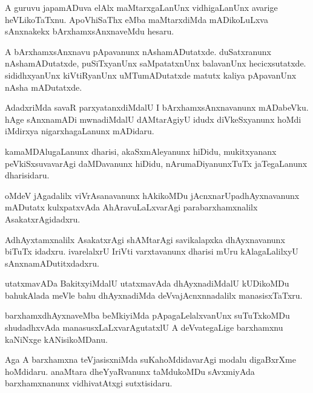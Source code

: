 \documentclass{article}
\begin{document}
\begin{mn}%
A guruvu japamADuva elAlx maMtarxgaLanUnx vidhigaLanUnx avarige
heVLikoTaTxnu. ApoVhiSaThx eMba maMtarxdiMda mADikoLuLxva sAnxnakekx
bArxhamxsAnxnaveMdu hesaru.
\end{mn}

\begin{mn}
A bArxhamxsAnxnavu pApavanunx nAshamADutatxde. duSatxranunx
nAshamADutatxde, puSiTxyanUnx saMpatatxnUnx balavanUnx
hecicxsutatxde. sididhxyanUnx kiVtiRyanUnx uMTumADutatxde matutx
kaliya pApavanUnx nAsha mADutatxde.
\end{mn}

\begin{mn}
AdadxriMda savaR parxyatanxdiMdalU I bArxhamxsAnxnavanunx
mADabeVku. hAge sAnxnamADi mwnadiMdalU dAMtarAgiyU idudx diVkeSxyanunx
hoMdi iMdirxya nigarxhagaLanunx mADidaru.
\end{mn}

\begin{mn}
kamaMDAlugaLanunx dharisi, akaSxmAleyanunx hiDidu, mukitxyananx
peVkiSxsuvavarAgi daMDavanunx hiDidu, nArumaDiyanunxTuTx jaTegaLanunx dharisidaru.
\end{mn}

\begin{mn}
oMdeV jAgadalilx viVrAsanavanunx hAkikoMDu jAcnxnarUpadhAyxnavanunx
mADutatx kulxpatxvAda AhAravuLaLxvarAgi parabarxhamxnalilx AsakatxrAgidadxru.
\end{mn}

\begin{mn}%
AdhAyxtamxnalilx AsakatxrAgi shAMtarAgi savikalapxka dhAyxnavanunx
biTuTx idadxru. ivarelalxrU IriVti varxtavanunx dharisi mUru
kAlagaLalilxyU sAnxnamADutitxdadxru.
\end{mn}

\begin{mn}
utatxmavADa BakitxyiMdalU utatxmavAda dhAyxnadiMdalU kUDikoMDu
bahukAlada meVle bahu dhAyxnadiMda deVvajAcnxnnadalilx manasisxTaTxru.
\end{mn}

\begin{mn}
barxhamxdhAyxnaveMba beMkiyiMda pApagaLelalxvanUnx suTuTxkoMDu
shudadhxvAda manasusxLaLxvarAgutatxlU A deVvategaLige barxhamxnu
kaNiNxge kANisikoMDanu.
\end{mn}

\begin{mn}
Aga A barxhamxna teVjasisxniMda suKahoMdidavarAgi modalu digaBxrXme
hoMdidaru. anaMtara dheYyaRvanunx taMdukoMDu sAvxmiyAda barxhamxnanunx
vidhivatAtxgi sutxtisidaru.
\end{mn}
\end{document}

